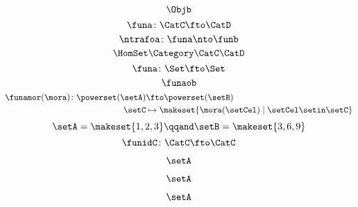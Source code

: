 \begin{forslides}
\begin{equation}
            \label{eq:slides_mora_objb}
            \Objb
        \end{equation}
        \begin{equation}
            \label{eq:slides_funa}
            \funa\colon\CatC\fto\CatD
        \end{equation}
        \begin{equation}
            \label{eq:slides_ntrafoa}
            \ntrafoa\colon\funa\nto\funb
        \end{equation}
        \begin{equation}
            \label{eq:slides_hom}
            \HomSet\Category\CatC\CatD
        \end{equation}
        \begin{equation}
            \label{eq:pow_fun_1}
            \funa\colon \Set \fto \Set
        \end{equation}
        \begin{equation}
            \label{eq:pow_fun_2}
            \funaob
        \end{equation}
        \begin{equation}
            \label{eq:pow_fun_3}
            \begin{aligned}
                \funamor(\mora)\colon \powerset(\setA) & \fto \powerset(\setB) \\
                \setC                                  & \mapsto \makeset{ \mora(\setCel) \mid \setCel \setin \setC}
            \end{aligned}
        \end{equation}
        \begin{equation}
            \label{eq:pow_fun_4}
            \setA=\makeset{ 1,2,3} \qqand \setB=\makeset{3,6,9}
        \end{equation}
        \begin{equation}
            \label{eq:idfun}
            \funidC \colon \CatC \fto \CatC
        \end{equation}
        
    
    \begin{equation}
        \label{eq:slides-translation-00}
        \setA
    \end{equation}

    \begin{equation}
        \label{eq:slides-translation-01}
        \setA
    \end{equation}

    \begin{equation}
        \label{eq:slides-translation-02}
        \setA
    \end{equation}


\end{forslides}
